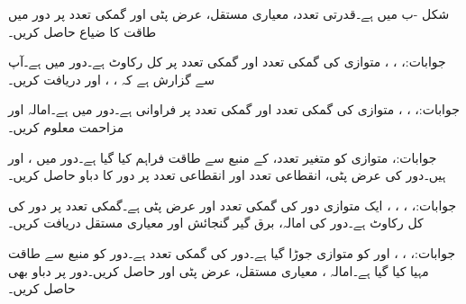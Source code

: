 شکل -ب میں  ہے۔قدرتی تعدد، معیاری مستقل، عرض پٹی اور گمکی تعدد پر دور میں طاقت کا ضیاع حاصل کریں۔

جوابات:، ، ، 
متوازی  کی گمکی تعدد  اور گمکی تعدد پر کل رکاوٹ  ہے۔دور میں  ہے۔آپ سے گزارش ہے کہ ، ،  اور  دریافت کریں۔

جوابات:، ، ، 
متوازی  کی گمکی تعدد  اور گمکی تعدد پر فراوانی  ہے۔دور میں  ہے۔امالہ  اور مزاحمت  معلوم کریں۔

جوابات:، 
متوازی  کو متغیر تعدد،  کے منبع سے طاقت فراہم کیا گیا ہے۔دور میں ،  اور  ہیں۔دور کی عرض پٹی، انقطاعی تعدد  اور انقطاعی تعدد پر دور کا دباو حاصل کریں۔

جوابات:، ، ، ، 
ایک متوازی  دور کی گمکی تعدد  اور عرض پٹی  ہے۔گمکی تعدد پر دور کی کل رکاوٹ  ہے۔دور کی امالہ، برق گیر گنجائش اور معیاری مستقل دریافت کریں۔

جوابات:، ، 
،  اور  کو متوازی جوڑا گیا ہے۔دور کی گمکی تعدد  ہے۔دور کو  منبع سے طاقت مہیا کیا گیا ہے۔امالہ ، معیاری مستقل، عرض پٹی  اور   حاصل کریں۔دور پر دباو  بھی حاصل کریں۔

